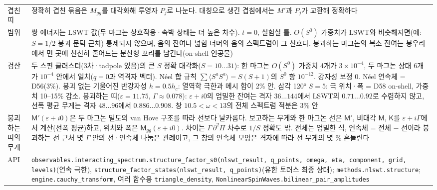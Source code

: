 \begin{tabularx}{\textwidth}{@{}P{3.0cm}Y@{}}
    겹친 띠 & 정확히 겹친 묶음은 $M_{gg}$를 대각화해 투영자 $P_j$로 나눈다. 대칭으로 생긴 겹침에서는 $M'$과 $P_j$가 교환해 정확하다 \\
    범위 & 쌍 에너지는 LSWT 값(두 마그논 상호작용·속박 상태는 더 높은 차수). $t=0$, 실험실 틀. $O(S^0)$ 가중치가 LSWT와 비슷해지면(예: $S=1/2$ 붕괴 문턱 근처) 통제되지 않으며, 음의 잔여나 넓힘 너머의 음의 스펙트럼이 그 신호다. 붕괴하는 마그논의 복소 잔여는 봉우리에서 먼 곳에 천천히 줄어드는 분산형 꼬리를 남긴다(on-shell 인공물) \\
    검산 & 두 스핀 클러스터(3차·tadpole 있음)의 큰 $S$ 정확 대각화($S=10\dots31$): 한 마그논 $O(S^0)$ 가중치 4개가 $3\times10^{-4}$, 두 마그논 상태 6개가 $10^{-4}$ 안에서 일치($q=0$과 역격자 벡터). Néel 합 규칙 $\sum\langle S^aS^a\rangle=S(S+1)$의 $S^0$ 항 $10^{-12}$. 강자성 보정 0. Néel 연속체 = D56(3\%). 붕괴 없는 기울어진 반강자성 $h=0.5h_c$: 열역학 극한과 메시 합이 2\% 안. 삼각 120° $S=5$: 극 위치·폭 = D58 on-shell, 가중치 10--15\% 감소. 붕괴하는 띠($\varepsilon=11.75$, $\Gamma\approx0.078$): $\varepsilon+i0$의 엄밀한 잔여는 격자 $36\dots144$에서 LSWT의 $0.71\dots0.92$로 수렴하지 않고, 선폭 평균 무게는 격자 $48\dots96$에서 $0.886\dots0.908$. 창 $10.5<\omega<13$의 전체 스펙트럼 적분은 3\% 안 \\
    붕괴하는 띠의 무게 & $\mathsf M'(\varepsilon+i0)$은 두 마그논 밀도의 van Hove 구조를 따라 선보다 날카롭다. 보고하는 무게와 한 마그논 선은 $\mathsf M'$, 비대각 $\mathsf M$, $\mathsf K$를 $\varepsilon+i\Gamma$에서 계산(선폭 평균)하고, 위치와 폭은 $\mathsf M_{gg}(\varepsilon+i0)$. 차이는 $\Gamma\,\partial^2\Pi$ 차수로 $1/S$ 정확도 밖. 전체는 엄밀한 식, 연속체 = 전체 $-$ 선이라 붕괴하는 선 근처 몇 $\Gamma$ 안의 선·연속체 나눔은 관례이고, 그 창의 연속체 모양은 격자에 따라 선 무게의 몇 \% 흔들린다 \\
    API & \texttt{observables.interacting\_spectrum.structure\_factor\_s0(nlswt\_result, q\_points, omega, eta, component, grid, levels)}(연속 극한), \texttt{structure\_factor\_states(nlswt\_result, q\_points)}(유한 토러스 최종 상태); \texttt{methods.nlswt.structure}; \texttt{engine.cauchy\_transform}, 여러 함수용 \texttt{triangle\_density}, \texttt{NonlinearSpinWaves.bilinear\_pair\_amplitudes} \\
    \bottomrule
  \end{tabularx}
\endgroup

